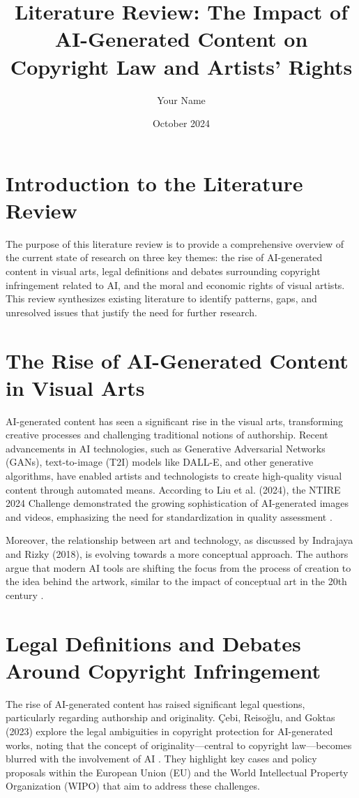 \documentclass{article}
\title{Literature Review: The Impact of AI-Generated Content on Copyright Law and Artists’ Rights}
\author{Your Name}
\date{October 2024}
\begin{document}
\maketitle

\tableofcontents
\newpage

\section{Introduction to the Literature Review}
The purpose of this literature review is to provide a comprehensive overview of the current state of research on three key themes: the rise of AI-generated content in visual arts, legal definitions and debates surrounding copyright infringement related to AI, and the moral and economic rights of visual artists. This review synthesizes existing literature to identify patterns, gaps, and unresolved issues that justify the need for further research.

\section{The Rise of AI-Generated Content in Visual Arts}
AI-generated content has seen a significant rise in the visual arts, transforming creative processes and challenging traditional notions of authorship. Recent advancements in AI technologies, such as Generative Adversarial Networks (GANs), text-to-image (T2I) models like DALL-E, and other generative algorithms, have enabled artists and technologists to create high-quality visual content through automated means. According to Liu et al. (2024), the NTIRE 2024 Challenge demonstrated the growing sophistication of AI-generated images and videos, emphasizing the need for standardization in quality assessment \cite{liu2024ntire}.

Moreover, the relationship between art and technology, as discussed by Indrajaya and Rizky (2018), is evolving towards a more conceptual approach. The authors argue that modern AI tools are shifting the focus from the process of creation to the idea behind the artwork, similar to the impact of conceptual art in the 20th century \cite{indrajaya2018techne}.

\section{Legal Definitions and Debates Around Copyright Infringement}
The rise of AI-generated content has raised significant legal questions, particularly regarding authorship and originality. Çebi, Reisoğlu, and Goktas (2023) explore the legal ambiguities in copyright protection for AI-generated works, noting that the concept of originality—central to copyright law—becomes blurred with the involvement of AI \cite{cebi2023influence}. They highlight key cases and policy proposals within the European Union (EU) and the World Intellectual Property Organization (WIPO) that aim to address these challenges.
\end{document}
